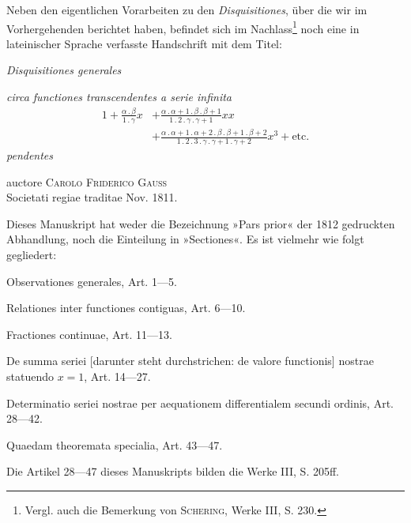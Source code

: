 \par\medskip
\begin{center}
\end{center}
\noindent\hspace*{\parindent}Neben den eigentlichen Vorarbeiten zu den \textit{Disquisitiones}, über die wir
im Vorhergehenden berichtet haben, befindet sich im Nachlass\footnote{Vergl. auch die Bemerkung von \textsc{Schering}, Werke III, S. 230.} noch eine
in lateinischer Sprache verfasste Handschrift mit dem Titel:
\begin{center}
\textit{Disquisitiones generales}
\end{center}
\noindent\textit{circa functiones transcendentes a serie infinita}
\[
\begin{aligned}
1+\frac{\alpha\mathbin{.}\beta}{1\mathbin{.}\gamma}x
&+\frac{\alpha\mathbin{.}\alpha+1\mathbin{.}\beta\mathbin{.}\beta+1}
{1\mathbin{.}2\mathbin{.}\gamma\mathbin{.}\gamma+1}xx\\
&+\frac{\alpha\mathbin{.}\alpha+1\mathbin{.}\alpha+2\mathbin{.}\beta\mathbin{.}\beta+1\mathbin{.}\beta+2}
{1\mathbin{.}2\mathbin{.}3\mathbin{.}\gamma\mathbin{.}\gamma+1\mathbin{.}\gamma+2}x^3+\text{etc.}
\end{aligned}
\]
\noindent\textit{pendentes}
\begin{center}
auctore \textsc{Carolo Friderico Gauss}\\
Societati regiae traditae Nov. 1811.
\end{center}
\noindent\hspace*{\parindent}Dieses Manuskript hat weder die Bezeichnung »Pars prior« der 1812 gedruckten
Abhandlung, noch die Einteilung in »Sectiones«. Es ist vielmehr
wie folgt gegliedert:
\par
Observationes generales, Art. 1—5.
\par
Relationes inter functiones contiguas, Art. 6—10.\par
\clearpage{}
\indent Fractiones continuae, Art. 11—13.
\par
De summa seriei [darunter steht durchstrichen: de valore functionis] nostrae
statuendo \(x=1\), Art. 14—27.
\par
Determinatio seriei nostrae per aequationem differentialem secundi ordinis,
Art. 28—42.
\par
Quaedam theoremata specialia, Art. 43—47.
\par
Die Artikel 28—47 dieses Manuskripts bilden die Werke III, S. 205ff.
